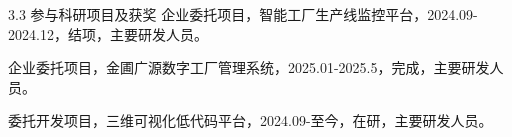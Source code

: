 \begin{resume}
\begin{resumelist}{\hspace{-0.25em}3.3\hspace{0.5em} 参与科研项目及获奖}
        \resumelistitem 企业委托项目，智能工厂生产线监控平台，2024.09-2024.12，结项，主要研发人员。

        \resumelistitem 企业委托项目，金圃广源数字工厂管理系统，2025.01-2025.5，完成，主要研发人员。

        \resumelistitem 委托开发项目，三维可视化低代码平台，2024.09-至今，在研，主要研发人员。

    \end{resumelist}
\end{resume}